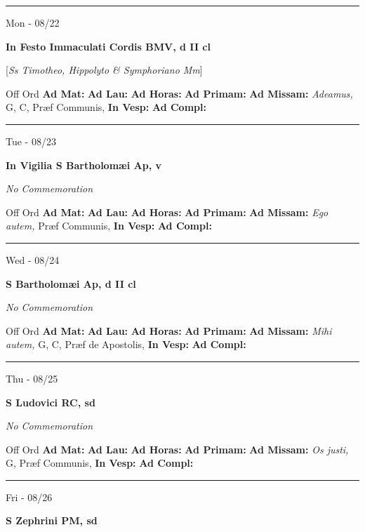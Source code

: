 \documentclass[letterpaper, 10pt]{article}
\begin{document}
\hrule
\begin{center}
Mon - 08/22
\end{center}\textbf{ \large In Festo Immaculati Cordis BMV, \textnormal{\normalsize d II cl}}

[\textit{Ss Timotheo, Hippolyto \& Symphoriano Mm}]
\begin{justify}
Off Ord
\textbf{Ad Mat: }
\textbf{Ad Lau: }
\textbf{Ad Horas: }
\textbf{Ad Primam: }
\textbf{Ad Missam:} \textit{Adeamus, } G, C, Præf Communis, 
\textbf{In Vesp: }
\textbf{Ad Compl: }\end{justify}



\hrule
\begin{center}
Tue - 08/23
\end{center}\textbf{ \large In Vigilia S Bartholomæi Ap, \textnormal{\normalsize v}}

\textit{No Commemoration}\begin{justify}
Off Ord
\textbf{Ad Mat: }
\textbf{Ad Lau: }
\textbf{Ad Horas: }
\textbf{Ad Primam: }
\textbf{Ad Missam:} \textit{Ego autem, } Præf Communis, 
\textbf{In Vesp: }
\textbf{Ad Compl: }\end{justify}



\hrule
\begin{center}
Wed - 08/24
\end{center}\textbf{ \large S Bartholomæi Ap, \textnormal{\normalsize d II cl}}

\textit{No Commemoration}\begin{justify}
Off Ord
\textbf{Ad Mat: }
\textbf{Ad Lau: }
\textbf{Ad Horas: }
\textbf{Ad Primam: }
\textbf{Ad Missam:} \textit{Mihi autem, } G, C, Præf de Apostolis, 
\textbf{In Vesp: }
\textbf{Ad Compl: }\end{justify}



\hrule
\begin{center}
Thu - 08/25
\end{center}\textbf{ \large S Ludovici RC, \textnormal{\normalsize sd}}

\textit{No Commemoration}\begin{justify}
Off Ord
\textbf{Ad Mat: }
\textbf{Ad Lau: }
\textbf{Ad Horas: }
\textbf{Ad Primam: }
\textbf{Ad Missam:} \textit{Os justi, } G, Præf Communis, 
\textbf{In Vesp: }
\textbf{Ad Compl: }\end{justify}



\hrule
\begin{center}
Fri - 08/26
\end{center}\textbf{ \large S Zephrini PM, \textnormal{\normalsize sd}}
\end{document}
